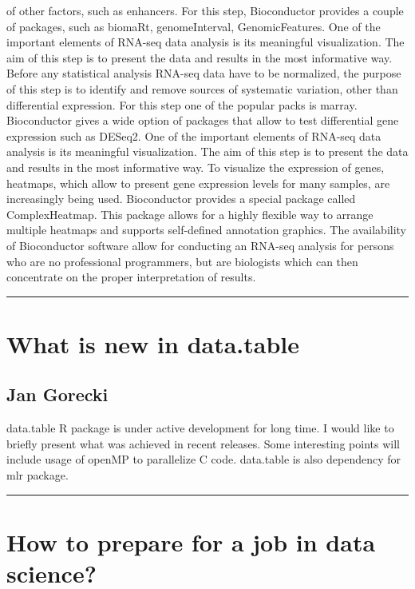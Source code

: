 \documentclass [12pt]{article}
\begin{document}
of other factors, such as enhancers. For this step, Bioconductor provides a couple of packages, such as biomaRt, genomeInterval, GenomicFeatures. One of the important elements of RNA-seq data analysis is its meaningful visualization. The aim of this step is to present the data and results in the most informative way. Before any statistical analysis RNA-seq data have to be normalized, the purpose of this step is to identify and remove sources of systematic variation, other than differential expression. For this step one of the popular packs is marray. Bioconductor gives a wide option of packages that allow to test differential gene expression such as DESeq2. One of the important elements of RNA-seq data analysis is its meaningful visualization. The aim of this step is to present the data and results in the most informative way. To visualize the expression of genes, heatmaps, which allow to present gene expression levels for many samples, are increasingly being used. Bioconductor provides a special package called ComplexHeatmap. This package allows for a highly flexible way to arrange multiple heatmaps and supports self-defined annotation graphics. The availability of Bioconductor software allow for conducting an RNA-seq analysis for persons who are no professional programmers, but are biologists which can then concentrate on the proper interpretation of results.

\noindent\rule{\textwidth}{1pt}
\section{What is new in data.table}
\subsection*{Jan Gorecki}

data.table R package is under active development for long time. I would like to briefly present what was achieved in recent releases. Some interesting points will include usage of openMP to parallelize C code. data.table is also dependency for mlr package.

\noindent\rule{\textwidth}{1pt}
\section{How to prepare for a job in data science?}
\end{document}
